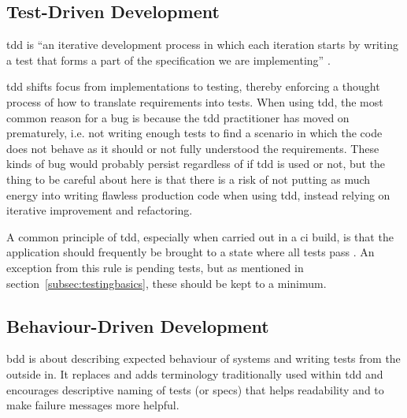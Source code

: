 \documentclass[11pt]{article}
\begin{document}
\subsection{Test-Driven Development}
\label{subsec:tdd}

\acrfull{tdd} is ``an iterative development process in which each iteration starts by writing a test that forms a part of the specification we are implementing'' \cite[p.~21]{Tddjs}.

\gls{tdd} shifts focus from implementations to testing, thereby enforcing a thought process of how to translate requirements into tests. When using \gls{tdd}, the most common reason for a bug is because the \gls{tdd} practitioner has moved on prematurely, i.e. not writing enough tests to find a scenario in which the code does not behave as it should or not fully understood the requirements. These kinds of bug would probably persist regardless of if \gls{tdd} is used or not, but the thing to be careful about here is that there is a risk of not putting as much energy into writing flawless production code when using \gls{tdd}, instead relying on iterative improvement and refactoring. %

A common principle of \gls{tdd}, especially when carried out in a \gls{ci} build, is that the application should frequently be brought to a state where all tests pass \cite[question~2]{Rovegard}. An exception from this rule is pending tests, but as mentioned in section~\ref{subsec:testingbasics}, these should be kept to a minimum.

\subsection{Behaviour-Driven Development}
\label{subsec:bdd}

\acrfull{bdd} is about describing expected behaviour of systems and writing tests from the outside in. It replaces and adds terminology traditionally used within \gls{tdd} and encourages descriptive naming of tests (or \glspl{spec}) that helps readability and to make failure messages more helpful. \cite[questions~17-18]{Ahnve}
\end{document}
